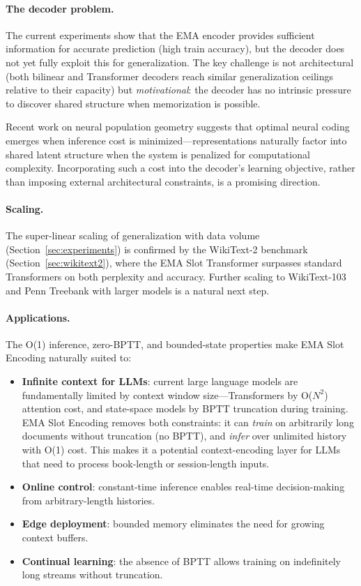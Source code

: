 \documentclass[11pt]{article}
\begin{document}
\paragraph{The decoder problem.}
The current experiments show that the EMA encoder provides sufficient information for accurate prediction (high train accuracy), but the decoder does not yet fully exploit this for generalization. The key challenge is not architectural (both bilinear and Transformer decoders reach similar generalization ceilings relative to their capacity) but \emph{motivational}: the decoder has no intrinsic pressure to discover shared structure when memorization is possible.

Recent work on neural population geometry \cite{wakhloo2024} suggests that optimal neural coding emerges when inference cost is minimized---representations naturally factor into shared latent structure when the system is penalized for computational complexity. Incorporating such a cost into the decoder's learning objective, rather than imposing external architectural constraints, is a promising direction.

\paragraph{Scaling.}
The super-linear scaling of generalization with data volume (Section~\ref{sec:experiments}) is confirmed by the WikiText-2 benchmark (Section~\ref{sec:wikitext2}), where the EMA Slot Transformer surpasses standard Transformers on both perplexity and accuracy. Further scaling to WikiText-103 and Penn Treebank with larger models is a natural next step.

\paragraph{Applications.}
The O(1) inference, zero-BPTT, and bounded-state properties make EMA Slot Encoding naturally suited to:
\begin{itemize}[leftmargin=1.5em]
    \item \textbf{Infinite context for LLMs}: current large language models are fundamentally limited by context window size---Transformers by O($N^2$) attention cost, and state-space models by BPTT truncation during training. EMA Slot Encoding removes both constraints: it can \emph{train} on arbitrarily long documents without truncation (no BPTT), and \emph{infer} over unlimited history with O(1) cost. This makes it a potential context-encoding layer for LLMs that need to process book-length or session-length inputs.
    \item \textbf{Online control}: constant-time inference enables real-time decision-making from arbitrary-length histories.
    \item \textbf{Edge deployment}: bounded memory eliminates the need for growing context buffers.
    \item \textbf{Continual learning}: the absence of BPTT allows training on indefinitely long streams without truncation.
\end{itemize}
\end{document}
